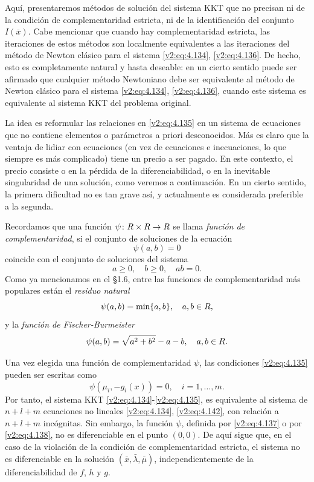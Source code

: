 Aquí, presentaremos métodos de solución del sistema KKT que no precisan ni de la condición de complementaridad estricta, ni de la identificación del conjunto $I(\bar{x})$. Cabe mencionar que cuando hay complementaridad estricta, las iteraciones de estos métodos son localmente equivalentes a las iteraciones del método de Newton clásico para el sistema \eqref{v2:eq:4.134}, \eqref{v2:eq:4.136}. De hecho, esto es completamente natural y hasta deseable: en un cierto sentido puede ser afirmado que cualquier método Newtoniano debe ser equivalente al método de Newton clásico para el sistema \eqref{v2:eq:4.134}, \eqref{v2:eq:4.136}, cuando este sistema es equivalente al sistema KKT del problema original.

La idea es reformular las relaciones en \eqref{v2:eq:4.135} en un sistema de ecuaciones que no contiene elementos o parámetros a priori desconocidos. Más es claro que la ventaja de lidiar con ecuaciones (en vez de ecuaciones e inecuaciones, lo que siempre es más complicado) tiene un precio a ser pagado. En este contexto, el precio consiste o en la pérdida de la diferenciabilidad, o en la inevitable singularidad de una solución, como veremos a continuación. En un cierto sentido, la primera dificultad no es tan grave así, y actualmente es considerada preferible a la segunda.

Recordamos que una función $\psi \colon R \times R \to R$ se llama \textit{función de complementaridad}, si el conjunto de soluciones de la ecuación
\[
    \psi(a, b) = 0
\]
coincide con el conjunto de soluciones del sistema
\[
    a \ge 0, \quad b \ge 0, \quad ab = 0.
\]
Como ya mencionamos en el \S 1.6, entre las funciones de complementaridad más populares están el \textit{residuo natural}
\begin{equation}
    \psi(a, b) = \min\{a, b\}, \quad a, b \in R,
    \label{v2:eq:4.137}
\end{equation}
y la \textit{función de Fischer-Burmeister}
\begin{equation}
    \psi(a, b) = \sqrt{a^2 + b^2} - a - b, \quad a, b \in R.
    \label{v2:eq:4.138}
\end{equation}


Una vez elegida una función de complementaridad $\psi$, las condiciones \eqref{v2:eq:4.135} pueden ser escritas como
\begin{equation}
    \psi(\mu_i, -g_i(x)) = 0, \quad i = 1, \dots, m.
    \label{v2:eq:4.142}
\end{equation}
Por tanto, el sistema KKT \eqref{v2:eq:4.134}-\eqref{v2:eq:4.135}, es equivalente al sistema de $n + l + m$ ecuaciones no lineales \eqref{v2:eq:4.134}, \eqref{v2:eq:4.142}, con relación a $n + l + m$ incógnitas. Sin embargo, la función $\psi$, definida por \eqref{v2:eq:4.137} o por \eqref{v2:eq:4.138}, no es diferenciable en el punto $(0, 0)$. De aquí sigue que, en el caso de la violación de la condición de complementaridad estricta, el sistema no es diferenciable en la solución $(\bar{x}, \bar{\lambda}, \bar{\mu})$, independientemente de la diferenciabilidad de $f$, $h$ y $g$.

